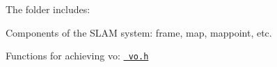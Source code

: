 The folder includes\+:


\begin{DoxyItemize}
\item Components of the SLAM system\+: frame, map, mappoint, etc.
\item Functions for achieving vo\+: \href{vo.h}{\texttt{ vo.\+h}} 
\end{DoxyItemize}